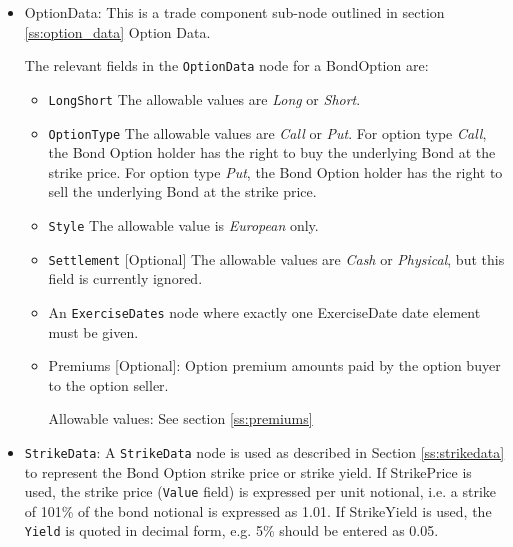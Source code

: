 \begin{itemize}
    \item OptionData: This is a trade component sub-node outlined in section \ref{ss:option_data} Option Data. 
    
The relevant fields in the \lstinline!OptionData! node for a BondOption are:

\begin{itemize}
\item \lstinline!LongShort! The allowable values are \emph{Long} or \emph{Short}.

\item \lstinline!OptionType! The allowable values are \emph{Call} or \emph{Put}. For option type \emph{Call}, the Bond Option holder has the right to buy the underlying Bond at the strike price. For option type \emph{Put}, the Bond Option holder has the right to sell the underlying Bond at the strike price. 
\item  \lstinline!Style! The allowable value is \emph{European} only.

\item  \lstinline!Settlement! [Optional] The allowable values are \emph{Cash} or \emph{Physical}, but this field is currently ignored.

\item An \lstinline!ExerciseDates! node where exactly one ExerciseDate date element must be given. \\

\item Premiums [Optional]: Option premium amounts paid by the option buyer to the option seller.

Allowable values:  See section \ref{ss:premiums}

\end{itemize}
    
    
    
    \item \lstinline!StrikeData!: A \lstinline!StrikeData! node is used as described in Section \ref{ss:strikedata} to represent the Bond Option strike price or strike yield. If StrikePrice is used, the strike price (\lstinline!Value! field) is expressed per unit notional, i.e. a strike of 101\% of the bond notional is expressed as 1.01.  If StrikeYield is used, the \lstinline!Yield! is quoted in decimal form, e.g. 5\% should be entered as 0.05.   
    

\end{itemize}
